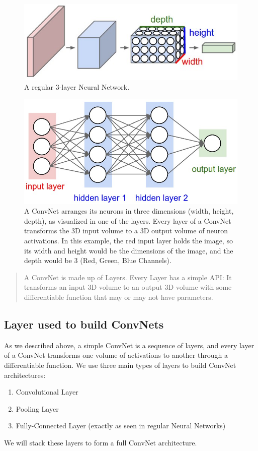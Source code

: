 \documentclass[fleqn,10pt]{olplainarticle}
\theoremstyle{definition}
\theoremstyle{remark}
\begin{document}
\begin{figure}[ht]
\centering
\includegraphics[width=0.7\linewidth]{images/cnn}
\caption{A regular 3-layer Neural Network.}
\label{fig:Sample Neural Neural Network}
\end{figure}

\begin{figure}[ht]
\centering
\includegraphics[width=0.7\linewidth]{images/neural_net2}
\caption{A ConvNet arranges its neurons in three dimensions (width, height, depth), as visualized in one of the layers. Every layer of a ConvNet transforms the 3D input volume to a 3D output volume of neuron activations. In this example, the red input layer holds the image, so its width and height would be the dimensions of the image, and the depth would be 3 (Red, Green, Blue Channels).}
\label{fig:Sample ConvNet}
\end{figure}

\begin{quote}
A ConvNet is made up of Layers. Every Layer has a simple API: It transforms an input 3D volume to an output 3D volume with some differentiable function that may or may not have parameters.
\end{quote}

\subsection*{Layer used to build ConvNets}
As we described above, a simple ConvNet is a sequence of layers, and every layer of a ConvNet transforms one volume of activations to another through a differentiable function. We use three main types of layers to build ConvNet architectures: 
\begin{enumerate}
\item Convolutional Layer
\item Pooling Layer
\item Fully-Connected Layer (exactly as seen in regular Neural Networks)
\end{enumerate}
We will stack these layers to form a full ConvNet architecture.
\end{document}
